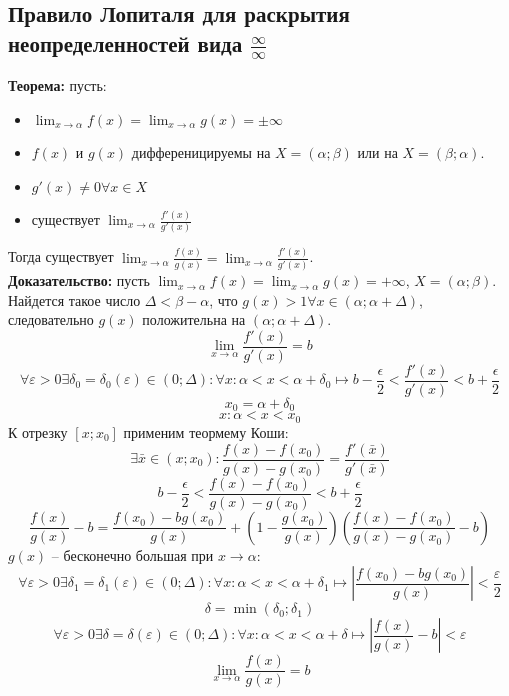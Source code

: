 \documentclass{article}
\newcommand{\theorem}{\textbf{Теорема:} }
\newcommand{\proof}{\textbf{Доказательство:} }
\newcommand{\intr}[2]{$(#1;#2)$}
\newcommand{\otr}[2]{$[#1;#2]$}
\begin{document}
    \subsection*{Правило Лопиталя для раскрытия неопределенностей вида $\frac{\infty}{\infty}$} 
        \theorem пусть:
        \begin {itemize}
            \item $ \lim_{x \to \alpha} f(x) = \lim_{x \to \alpha} g(x) = \pm \infty $
            \item $ f(x)$ и $g(x)$ дифференицируемы на $X = (\alpha;\beta)$ или на $X = (\beta;\alpha)$.
            \item $ g'(x)\neq 0 \forall x \in X $
            \item существует $ \lim_{x \to \alpha} \frac{f'(x)}{g'(x)} $
        \end {itemize}
        Тогда существует $ \lim_{x \to \alpha} \frac{f(x)}{g(x)} = \lim_{x \to \alpha} \frac{f'(x)}{g'(x)} $.
        \\
        \proof пусть $\lim_{x \to \alpha} f(x) = \lim_{x \to \alpha} g(x) = +\infty$, $X = (\alpha;\beta)$.
        Найдется такое число $\Delta < \beta - \alpha$, что $g(x) > 1 \forall x \in (\alpha;\alpha + \Delta)$, следовательно $g(x)$ положительна на \intr{\alpha}{\alpha + \Delta}.
        \[ \lim_{x \to \alpha} \frac{f'(x)}{g'(x)} = b \]
        \[ \forall \varepsilon > 0 \exists \delta_0 = \delta_0(\varepsilon) \in (0; \Delta): \forall x: \alpha < x < \alpha + \delta_0 \longmapsto
            b - \frac{\epsilon}{2} < \frac{f'(x)}{g'(x)} < b + \frac{\epsilon}{2} \]
        \[ x_0 = \alpha + \delta_0 \]
        \[ x: \alpha < x < x_0 \]
        К отрезку \otr{x}{x_0} применим теормему Коши:
        \[ \exists \bar x \in (x; x_0):
           \frac{f(x) - f(x_0)}{g(x) - g(x_0)} = \frac{f'(\bar x)}{g'(\bar x)} \]
        \[ b - \frac{\epsilon}{2} < \frac{f(x) - f(x_0)}{g(x) - g(x_0)} < b + \frac{\epsilon}{2} \]
        \[ \frac{f(x)}{g(x)} - b = \frac{f(x_0) - b g(x_0)}{g(x)} + \left( 1 - \frac{g(x_0)}{g(x)} \right) \left( \frac{f(x) - f(x_0)}{g(x) - g(x_0)} - b \right) \]
        $g(x)$ -- бесконечно большая при $x \to \alpha$:
        \[ \forall \varepsilon > 0 \exists \delta_1 = \delta_1(\varepsilon) \in (0; \Delta): \forall x: \alpha < x < \alpha + \delta_1 \longmapsto 
           \left| \frac{f(x_0) - b g(x_0)}{g(x)} \right| < \frac{\varepsilon}{2} \]
        \[ \delta = \min (\delta_0; \delta_1) \]
        \[ \forall \varepsilon > 0 \exists \delta = \delta(\varepsilon) \in (0; \Delta): \forall x: \alpha < x < \alpha + \delta \longmapsto
           \left| \frac{f(x)}{g(x)} - b \right| < \varepsilon \]
        \[ \lim_{x \to \alpha} \frac{f(x)}{g(x)} = b \]
\end{document}
